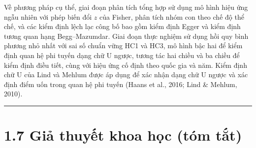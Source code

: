 \documentclass[
  a4paper,
  13pt]{extreport}
\begin{document}
Về phương pháp cụ thể, giai đoạn phân tích tổng hợp sử dụng mô hình hiệu
ứng ngẫu nhiên với phép biến đổi \(z\) của Fisher, phân tích nhóm con
theo chế độ thể chế, và các kiểm định lệch lạc công bố bao gồm kiểm định
Egger và kiểm định tương quan hạng Begg--Mazumdar. Giai đoạn thực nghiệm
sử dụng hồi quy bình phương nhỏ nhất với sai số chuẩn vững HC1 và HC3,
mô hình bậc hai để kiểm định quan hệ phi tuyến dạng chữ U ngược, tương
tác hai chiều và ba chiều để kiểm định điều tiết, cùng với hiệu ứng cố
định theo quốc gia và năm. Kiểm định chữ U của Lind và Mehlum được áp
dụng để xác nhận dạng chữ U ngược và xác định điểm uốn trong quan hệ phi
tuyến (Haans et al., 2016; Lind \& Mehlum, 2010).

\begin{center}\rule{0.5\linewidth}{0.5pt}\end{center}

\hypertarget{giux1ea3-thuyux1ebft-khoa-hux1ecdc-tuxf3m-tux1eaft}{%
\section{1.7 Giả thuyết khoa học (tóm
tắt)}\label{giux1ea3-thuyux1ebft-khoa-hux1ecdc-tuxf3m-tux1eaft}}
\end{document}

